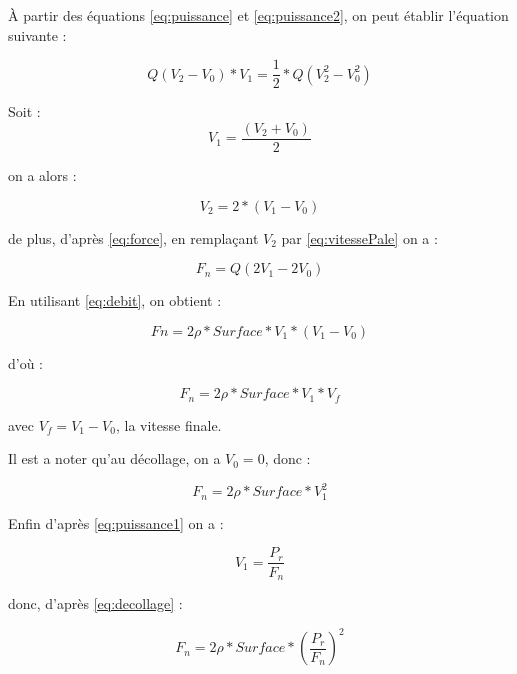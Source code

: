 \documentclass[a4paper,10pt]{report}
\begin{document}
	À partir des équations \ref{eq:puissance} et \ref{eq:puissance2}, on 
peut établir l'équation suivante : 
	
	\begin{equation}
	  Q(V_{2} - V_{0})*V_{1} = \frac{1}{2} * Q (V_{2}^{2}-V_{0}^{2})
	\end{equation}
	
	Soit :
	\begin{equation}
	  \label{eq:vitessePale}
	  V_{1} = \frac{(V_{2} + V_{0})}{2} 
	\end{equation}
	
	on a alors :
	
	\begin{equation}
	  V_{2} = 2*(V_{1} - V_{0})
	\end{equation}
	
	de plus, d'après \ref{eq:force}, en remplaçant $V_{2}$ par 
\ref{eq:vitessePale} on a :
	
	\begin{equation}
	  F_{n} = Q(2V_{1} - 2V_{0})
	\end{equation}
	
	En utilisant \ref{eq:debit}, on obtient :
	
	\begin{equation}
	  Fn = 2 \rho * Surface * V_{1} * (V_{1} - V_{0})
	\end{equation}

	d'où :
	
	\begin{equation}
	  \label{eqForce}
	  F_{n} =  2 \rho * Surface *V_{1} * V_{f}
	\end{equation}
	
	avec $V_{f} = V_{1} - V_{0}$, la vitesse finale.
	
	Il est a noter qu'au décollage, on a $V_{0} = 0$, donc :
	
	\begin{equation}
	  \label{eq:decollage}
	  F_{n} =  2 \rho * Surface * V_{1}^{2}
	\end{equation}
	
	Enfin d'après \ref{eq:puissance1} on a :
	
	\begin{equation}
	  V_{1} =  \frac{P_{r}}{F_{n}}
	\end{equation}
	
	donc, d'après \ref{eq:decollage} :
	
	\begin{equation}
	  F_{n} = 2 \rho * Surface * (\frac{P_{r}}{F_{n}})^{2}
	\end{equation}
	
\end{document}

